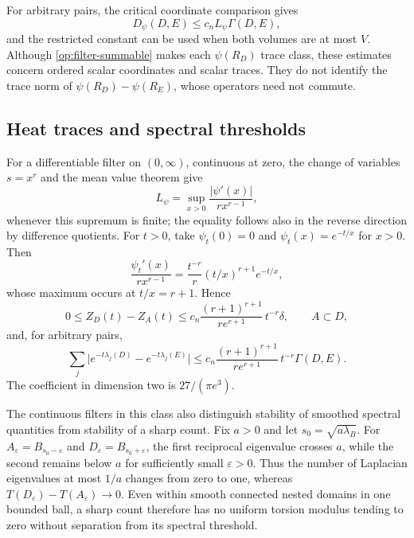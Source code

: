 \documentclass[11pt,reqno]{amsart}
\numberwithin{equation}{section}
\newcommand{\abs}[1]{\lvert#1\rvert}
\begin{document}
For arbitrary pairs, the critical coordinate comparison gives
\begin{equation}\label{op:filter-arbitrary}
 D_\psi(D,E)\le c_nL_\psi\Gamma(D,E),
\end{equation}
and the restricted constant can be used when both volumes are at
most $V$.  Although \eqref{op:filter-summable} makes each
$\psi(R_D)$ trace class, these estimates concern ordered scalar
coordinates and scalar traces.  They do not identify the trace norm
of $\psi(R_D)-\psi(R_E)$, whose operators need not commute.

\subsection{Heat traces and spectral thresholds}
\label{op:heat-filters}

For a differentiable filter on $(0,\infty)$, continuous at zero,
the change of variables $s=x^r$ and the mean value theorem give
\begin{equation}\label{op:derivative-L}
 L_\psi=\sup_{x>0}\frac{\abs{\psi'(x)}}{rx^{r-1}},
\end{equation}
whenever this supremum is finite; the equality follows also in the
reverse direction by difference quotients.
For $t>0$, take $\psi_t(0)=0$ and
$\psi_t(x)=e^{-t/x}$ for $x>0$.  Then
\[
 \frac{\psi_t'(x)}{rx^{r-1}}
 =\frac{t^{-r}}r (t/x)^{r+1}e^{-t/x},
\]
whose maximum occurs at $t/x=r+1$.  Hence
\begin{equation}\label{op:heat-filter-bound}
 0\le Z_D(t)-Z_A(t)
 \le c_n\frac{(r+1)^{r+1}}{re^{r+1}}\,t^{-r}\delta,
 \qquad A\subset D,
\end{equation}
and, for arbitrary pairs,
\begin{equation}\label{op:heat-filter-pair}
 \sum_j\abs{e^{-t\lambda_j(D)}-e^{-t\lambda_j(E)}}
 \le c_n\frac{(r+1)^{r+1}}{re^{r+1}}\,t^{-r}\Gamma(D,E).
\end{equation}
The coefficient in dimension two is $27/(\pi e^3)$.

The continuous filters in this class also distinguish stability of
smoothed spectral quantities from stability of a sharp count.
Fix $a>0$ and let $s_0=\sqrt{a\lambda_B}$.
For $A_\varepsilon=B_{s_0-\varepsilon}$ and
$D_\varepsilon=B_{s_0+\varepsilon}$, the first reciprocal
eigenvalue crosses $a$, while the second remains below $a$ for
sufficiently small $\varepsilon>0$.  Thus the number of Laplacian
eigenvalues at most $1/a$ changes from zero to one, whereas
$T(D_\varepsilon)-T(A_\varepsilon)\to0$.
Even within smooth connected nested domains in one bounded ball,
a sharp count therefore has no uniform torsion modulus tending to
zero without separation from its spectral threshold.
\end{document}
